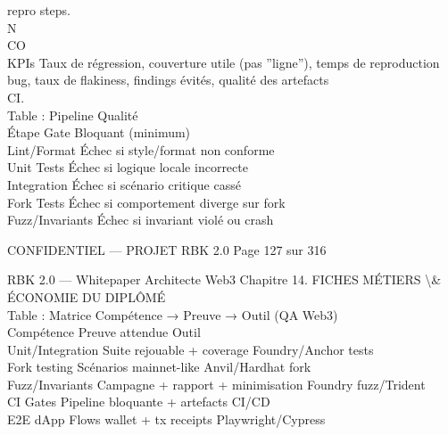 \documentclass[12pt,landscape,a4paper]{article}
\newenvironment{confidential}
{\begin{tcolorbox}[
    colback=rbkred!5!white,
    colframe=rbkred!75!black,
    title=CONFIDENTIEL,
    fonttitle=\bfseries\color{white},
    coltitle=rbkred!75!black,
    breakable,
    enhanced,
    frame hidden,
    borderline west={2pt}{0pt}{rbkred!75!black}
]}
{\end{tcolorbox}}
\begin{document}
repro steps.\\
N\\
CO\\
KPIs Taux de régression, couverture utile (pas ”ligne”), temps de reproduction bug, taux de flakiness, findings évités, qualité des artefacts\\
CI.\\
Table : Pipeline Qualité\\
Étape           Gate Bloquant (minimum)\\
Lint/Format     Échec si style/format non conforme\\
Unit Tests      Échec si logique locale incorrecte\\
Integration     Échec si scénario critique cassé\\
Fork Tests      Échec si comportement diverge sur fork\\
Fuzz/Invariants Échec si invariant violé ou crash\\
\vspace{0.5em}
\vspace{0.5em}
\begin{confidential}CONFIDENTIEL — PROJET RBK 2.0                                  Page 127 sur 316\end{confidential}
RBK 2.0 — Whitepaper Architecte Web3                                                Chapitre 14. FICHES MÉTIERS \textbackslash{}& ÉCONOMIE DU DIPLÔMÉ\\
\vspace{0.5em}
\vspace{0.5em}
Table : Matrice Compétence → Preuve → Outil (QA Web3)\\
\vspace{0.5em}
Compétence       Preuve attendue                  Outil\\
Unit/Integration Suite rejouable + coverage       Foundry/Anchor tests\\
Fork testing     Scénarios mainnet-like           Anvil/Hardhat fork\\
Fuzz/Invariants Campagne + rapport + minimisation Foundry fuzz/Trident\\
CI Gates         Pipeline bloquante + artefacts   CI/CD\\
E2E dApp         Flows wallet + tx receipts       Playwright/Cypress\\
\vspace{0.5em}
\vspace{0.5em}
\vspace{0.5em}
\end{document}
